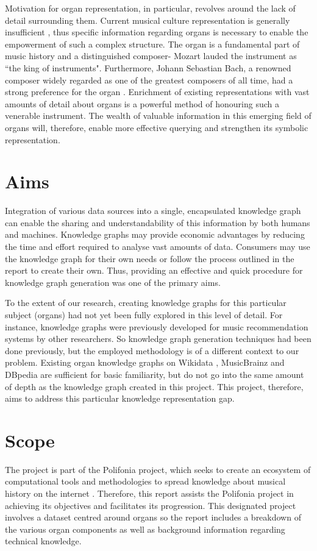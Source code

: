 Motivation for organ representation, in particular, revolves around the lack of detail surrounding them. Current musical culture representation is generally insufficient \cite{polifoniaproject}, thus specific information regarding organs is necessary to enable the empowerment of such a complex structure. The organ is a fundamental part of music history and a distinguished composer- Mozart lauded the instrument as ``the king of instruments". Furthermore, Johann Sebastian Bach, a renowned composer widely regarded as one of the greatest composers of all time, had a strong preference for the organ \cite{wolff2011organs}. Enrichment of existing representations with vast amounts of detail about organs is a powerful method of honouring such a venerable instrument. The wealth of valuable information in this emerging field of organs will, therefore, enable more effective querying and strengthen its symbolic representation. 

\section{Aims}
\hspace{0.5cm} Integration of various data sources into a single, encapsulated knowledge graph can enable the sharing and understandability of this information by both humans and machines. Knowledge graphs may provide economic advantages by reducing the time and effort required to analyse vast amounts of data. Consumers may use the knowledge graph for their own needs or follow the process outlined in the report to create their own. Thus, providing an effective and quick procedure for knowledge graph generation was one of the primary aims.  

To the extent of our research, creating knowledge graphs for this particular subject (organs) had not yet been fully explored in this level of detail. For instance, knowledge graphs were previously developed for music recommendation systems \cite{oramas2016sound} by other researchers. So knowledge graph generation techniques had been done previously, but the employed methodology is of a different context to our problem. Existing organ knowledge graphs on Wikidata \cite{organwikidata}, MusicBrainz \cite{organmusicbrainz} and DBpedia \cite{organdbpedia} are sufficient for basic familiarity, but do not go into the same amount of depth as the knowledge graph created in this project. This project, therefore, aims to address this particular knowledge representation gap. 

\section{Scope}
\hspace{0.5cm} The project is part of the Polifonia project, which seeks to create an ecosystem of computational tools and methodologies to spread knowledge about musical history on the internet \cite{polifoniaproject}. Therefore, this report assists the Polifonia project in achieving its objectives and facilitates its progression. This designated project involves a dataset centred around organs so the report includes a breakdown of the various organ components as well as background information regarding technical knowledge. 

